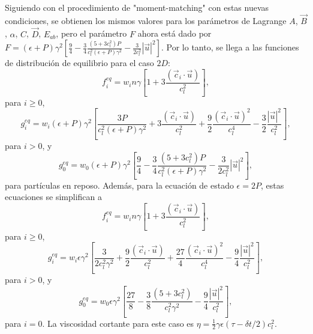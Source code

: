 \documentclass{article}
\begin{document}
Siguiendo con el procedimiento de "moment-matching" con estas nuevas condiciones, se obtienen los mismos valores para los parámetros de Lagrange $A$, $\vec{B}$, $\alpha$, $C$, $\vec{D}$, $E_{ab}$, pero el parámetro $F$ ahora está dado por $F= (\epsilon+P) \gamma^2\left[ \frac{9}{4}- \frac{3}{4}\frac{(5+3c_l^2)P}{c_l^2(\epsilon+P)\gamma^2}- \frac{3}{2c_l^2} |\vec{u}|^2 \right].$ Por lo tanto, se llega a las funciones de distribución de equilibrio para el caso $2D$:
  \begin{equation}
     f_i^{eq} = w_i n\gamma\left[ 1+3 \frac{(\vec{c}_i\cdot \vec{u})}{c_l^2} \right], 
 \end{equation}
 para $i\geq 0$, 
 \begin{equation}
     g_i^{eq} = w_i(\epsilon+P)\gamma^2\left[ \frac{3P}{c_l^2(\epsilon+P)\gamma^2}+3 \frac{(\vec{c}_i\cdot \vec{u})}{c_l^2}+ \frac{9}{2} \frac{(\vec{c}_i\cdot \vec{u})^2}{c_l^4}-\frac{3}{2}\frac{|\vec{u}|^2}{c_l^2} \right], 
 \end{equation}
  para $i> 0$, y
   \begin{equation}
     g_0^{eq} = w_0(\epsilon+P) \gamma^2\left[ \frac{9}{4}- \frac{3}{4}\frac{(5+3c_l^2)P}{c_l^2(\epsilon+P)\gamma^2}- \frac{3}{2c_l^2} |\vec{u}|^2 \right], 
 \end{equation}
 para partículas en reposo. Además, para la ecuación de estado $\epsilon=2P$, estas ecuaciones se simplifican a 
   \begin{equation}
     f_i^{eq} = w_i n\gamma\left[ 1+3 \frac{(\vec{c}_i\cdot \vec{u})}{c_l^2} \right], 
 \end{equation}
 para $i\geq 0$, 
 \begin{equation}
     g_i^{eq} = w_i\epsilon\gamma^2\left[ \frac{3}{2c_l^2\gamma^2}+\frac{9}{2} \frac{(\vec{c}_i\cdot \vec{u})}{c_l^2}+ \frac{27}{4} \frac{(\vec{c}_i\cdot \vec{u})^2}{c_l^4}-\frac{9}{4}\frac{|\vec{u}|^2}{c_l^2} \right], 
 \end{equation}
  para $i> 0$, y
   \begin{equation}
     g_0^{eq} = w_0\epsilon\gamma^2\left[\frac{27}{8}-\frac{3}{8} \frac{(5+3c_l^2)}{c_l^2\gamma^2}-\frac{9}{4}\frac{|\vec{u}|^2}{c_l^2} \right], 
 \end{equation}
 para $i=0$. La viscosidad cortante para este caso es $\eta = \frac{1}{2} \gamma \epsilon (\tau-\delta t /2) c_l^2$. 
 
\end{document}
